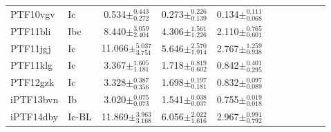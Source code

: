\documentclass[a4paper,fleqn,usenatbib]{mnras}
\begin{document}
\begin{table}
\begin{minipage}{140mm}
\begin{tabular}{@{}llcccccclcc@{}}
PTF10vgv & Ic & 0.534$ \pm^{0.443}_{0.272}$ &0.273$ \pm^{0.226}_{0.139}$ &0.134$ \pm^{0.111}_{0.068}$ \\
PTF11bli & Ibc & 8.440$ \pm^{3.059}_{2.404}$ &4.306$ \pm^{1.561}_{1.226}$ &2.110$ \pm^{0.765}_{0.601}$ \\
PTF11jgj & Ic & 11.066$ \pm^{5.037}_{3.751}$ &5.646$ \pm^{2.570}_{1.914}$ &2.767$ \pm^{1.259}_{0.938}$ \\
PTF11klg & Ic & 3.367$ \pm^{1.605}_{1.181}$ &1.718$ \pm^{0.819}_{0.602}$ &0.842$ \pm^{0.401}_{0.295}$ \\
PTF12gzk & Ic & 3.328$ \pm^{0.387}_{0.356}$ &1.698$ \pm^{0.197}_{0.181}$ &0.832$ \pm^{0.097}_{0.089}$ \\
iPTF13bvn & Ib & 3.020$ \pm^{0.075}_{0.073}$ &1.541$ \pm^{0.038}_{0.037}$ &0.755$ \pm^{0.019}_{0.018}$ \\
iPTF14dby & Ic-BL & 11.869$ \pm^{3.963}_{3.168}$ &6.056$ \pm^{2.022}_{1.616}$ &2.967$ \pm^{0.991}_{0.792}$ \\

 \hline
\end{tabular}
\end{minipage}
\end{table}


\bsp	%
\label{lastpage}
\end{document}
